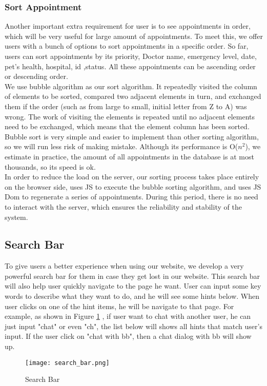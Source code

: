 \documentclass[a4paper]{article}
\begin{document}
\subsubsection{Sort Appointment}
Another important extra requirement for user is to see appointments in order, which will be very useful for large amount of appointments. To meet this, we offer users with a bunch of options to sort appointments in a specific order. So far, users can sort appointments by its priority, Doctor name, emergency level, date, pet's health, hospital, id ,status. All these appointments can be ascending order or descending order. 
\quad\\
We use bubble algorithm as our sort algorithm. It repeatedly visited the column of elements to be sorted, compared two adjacent elements in turn, and exchanged them if the order (such as from large to small, initial letter from Z to A) was wrong. The work of visiting the elements is repeated until no adjacent elements need to be exchanged, which means that the element column has been sorted. Bubble sort is very simple and easier to implement than other sorting algorithm, so we will run less risk of making mistake. Although its performance is O($n^2$), we estimate in practice, the amount of all appointments in the database is at most thousands, so its speed is ok. 
\quad\\
In order to reduce the load on the server, our sorting process takes place entirely on the browser side, uses JS to execute the bubble sorting algorithm, and uses JS Dom to regenerate a series of appointments. During this period, there is no need to interact with the server, which ensures the reliability and stability of the system.

\subsection{Search Bar}
To give users a better experience when using our website, we develop a very powerful search bar for them in case they get lost in our website. This search bar will also help user quickly navigate to the page he want. User can input some key words to describe what they want to do, and he will see some hints below. When user clicks on one of the hint items, he will be navigate to that page. For example, as shown in Figure \ref{search_bar} , if user want to chat with another user, he can just input "chat" or even "ch", the list below will shows all hints that match user's input. If the user click on "chat with bb", then a chat dialog with bb will show up.
\begin{figure}[h]
    \centering
    \texttt{[image: search\_bar.png]}
    \caption{Search Bar}
    \label{search_bar}
\end{figure}
\end{document}
